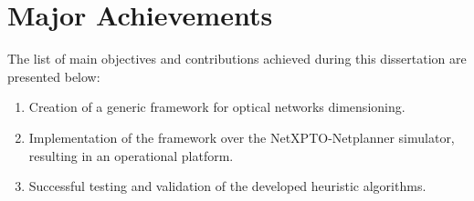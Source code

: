 
\section{Major Achievements}

The list of main objectives and contributions achieved during this dissertation are presented below:

\begin{enumerate}
\item Creation of a generic framework for optical networks dimensioning.
\item Implementation of the framework over the NetXPTO-Netplanner simulator, resulting in an operational platform.
\item Successful testing and validation of the developed heuristic algorithms.
\end{enumerate}

